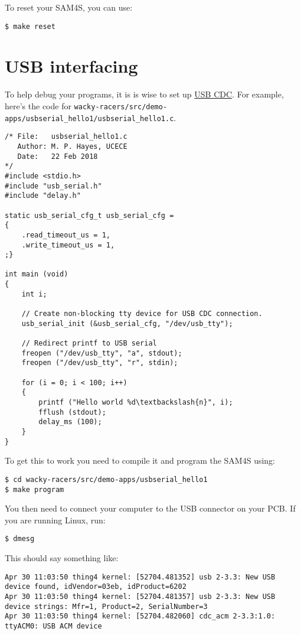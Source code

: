 To reset your SAM4S, you can use:
%
\begin{verbatim}
$ make reset
\end{verbatim}

\section{USB interfacing}
\label{usb-interfacing}

To help debug your programs, it is is wise to set up \href{USB_CDC}{USB
CDC}. For example, here's the code for
\texttt{wacky-racers/src/demo-apps/usbserial\_hello1/usbserial\_hello1.c}.

\begin{verbatim}
/* File:   usbserial_hello1.c
   Author: M. P. Hayes, UCECE
   Date:   22 Feb 2018
*/
#include <stdio.h>
#include "usb_serial.h"
#include "delay.h"

static usb_serial_cfg_t usb_serial_cfg =
{
    .read_timeout_us = 1,
    .write_timeout_us = 1,
;}

int main (void)
{
    int i;

    // Create non-blocking tty device for USB CDC connection.
    usb_serial_init (&usb_serial_cfg, "/dev/usb_tty");
    
    // Redirect printf to USB serial
    freopen ("/dev/usb_tty", "a", stdout);
    freopen ("/dev/usb_tty", "r", stdin);    

    for (i = 0; i < 100; i++)
    {
        printf ("Hello world %d\textbackslash{n}", i);
        fflush (stdout);
        delay_ms (100);
    }
}
\end{verbatim}

To get this to work you need to compile it and program the SAM4S using:

\begin{verbatim}
$ cd wacky-racers/src/demo-apps/usbserial_hello1
$ make program
\end{verbatim}

You then need to connect your computer to the USB connector on your PCB.
If you are running Linux, run:
%
\begin{verbatim}
$ dmesg
\end{verbatim}

This should say something like:
%
\begin{verbatim}
Apr 30 11:03:50 thing4 kernel: [52704.481352] usb 2-3.3: New USB device found, idVendor=03eb, idProduct=6202
Apr 30 11:03:50 thing4 kernel: [52704.481357] usb 2-3.3: New USB device strings: Mfr=1, Product=2, SerialNumber=3
Apr 30 11:03:50 thing4 kernel: [52704.482060] cdc_acm 2-3.3:1.0: ttyACM0: USB ACM device
\end{verbatim}

